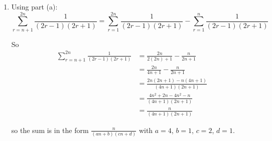 \documentclass[leqno]{article}
\begin{document}
\begin{enumerate}[
  label=\textbf{\arabic*.},
  leftmargin=*,
  topsep=0pt,
  partopsep=0pt,
  parsep=0pt
]
\begin{djsSolution}
\begin{enumerate}[label=\textbf{(\alph*)}]
\textbf{Inductive hypothesis:} Assume the statement is true for $n=k$, where $k$ is a positive integer. That is, assume
\[
S_k=\sum_{r=1}^{k}\frac{1}{(2r-1)(2r+1)}=\frac{k}{2k+1}
\]

\textbf{Inductive step:} Consider $S_{k+1}$:
\begin{align*}
S_{k+1}
&=\sum_{r=1}^{k+1}\frac{1}{(2r-1)(2r+1)} \\
&=\sum_{r=1}^{k}\frac{1}{(2r-1)(2r+1)}+\frac{1}{(2(k+1)-1)(2(k+1)+1)} \\
&=S_k+\frac{1}{(2k+1)(2k+3)}
\end{align*}

Using the inductive hypothesis:
\begin{align*}
S_{k+1}
&=\frac{k}{2k+1}+\frac{1}{(2k+1)(2k+3)} \\
&=\frac{k(2k+3)+1}{(2k+1)(2k+3)} \\
&=\frac{2k^2+3k+1}{(2k+1)(2k+3)} \\
&=\frac{(2k+1)(k+1)}{(2k+1)(2k+3)} \\
&=\frac{k+1}{2k+3}
\end{align*}

This is the right-hand side with $n=k+1$, since
\[
\frac{k+1}{2k+3}=\frac{k+1}{2(k+1)+1}
\]

so the statement is true for $n=k+1$.

\textbf{Conclusion:} If the statement is true for $n=k$, then it is true for $n=k+1$. Since it is true for $n=1$, by the principle of mathematical induction the statement is true for all positive integers $n$.

\item Using part (a):
\[
\sum_{r=n+1}^{2n}\frac{1}{(2r-1)(2r+1)}
=
\sum_{r=1}^{2n}\frac{1}{(2r-1)(2r+1)}
-
\sum_{r=1}^{n}\frac{1}{(2r-1)(2r+1)}
\]

So
\begin{align*}
\sum_{r=n+1}^{2n}\frac{1}{(2r-1)(2r+1)}
&=\frac{2n}{2(2n)+1}-\frac{n}{2n+1} \\
&=\frac{2n}{4n+1}-\frac{n}{2n+1} \\
&=\frac{2n(2n+1)-n(4n+1)}{(4n+1)(2n+1)} \\
&=\frac{4n^2+2n-4n^2-n}{(4n+1)(2n+1)} \\
&=\frac{n}{(4n+1)(2n+1)}
\end{align*}

so the sum is in the form $\frac{n}{(an+b)(cn+d)}$ with $a=4$, $b=1$, $c=2$, $d=1$.

\end{enumerate}
\end{djsSolution}



\end{enumerate}
\end{document}
